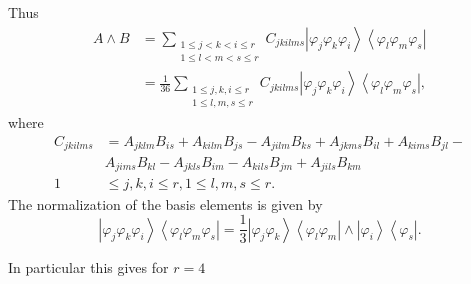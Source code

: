 \documentclass[aps,preprint]{revtex4}%
\begin{document}
Thus
\begin{align}
A\wedge B &  =\sum_{\substack{1\leq j<k<i\leq r\\1\leq l<m<s\leq r}%
}C_{jkilms}\left\vert \varphi_{j}\varphi_{k}\varphi_{i}\right\rangle
\left\langle \varphi_{l}\varphi_{m}\varphi_{s}\right\vert \\
&  =\frac{1}{36}\sum_{\substack{1\leq j,k,i\leq r\\1\leq l,m,s\leq
r}}C_{jkilms}\left\vert \varphi_{j}\varphi_{k}\varphi_{i}\right\rangle
\left\langle \varphi_{l}\varphi_{m}\varphi_{s}\right\vert ,
\end{align}
where
\begin{align}
C_{jkilms} &  =A_{jklm}B_{is}+A_{kilm}B_{js}-A_{jilm}B_{ks}+A_{jkms}%
B_{il}+A_{kims}B_{jl}-\nonumber\\
&  A_{jims}B_{kl}-A_{jkls}B_{im}-A_{kils}B_{jm}+A_{jils}B_{km}\nonumber\\
1 &  \leq j,k,i\leq r,1\leq l,m,s\leq r.
\end{align}
The normalization of the basis elements is given by
\begin{equation}
\left\vert \varphi_{j}\varphi_{k}\varphi_{i}\right\rangle \left\langle
\varphi_{l}\varphi_{m}\varphi_{s}\right\vert =\frac{1}{3}\left\vert
\varphi_{j}\varphi_{k}\right\rangle \left\langle \varphi_{l}\varphi
_{m}\right\vert \wedge\left\vert \varphi_{i}\right\rangle \left\langle
\varphi_{s}\right\vert .
\end{equation}


In particular this gives for $r=4$%
\end{document}

